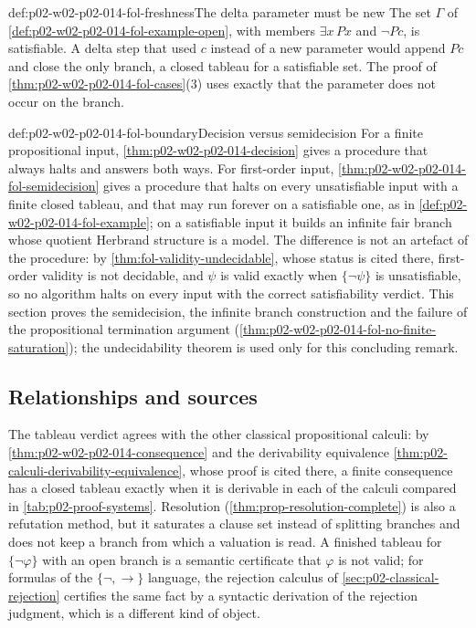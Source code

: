 \begin{hbwarning}{def:p02-w02-p02-014-fol-freshness}{The delta parameter must be new}
The set \(\Gamma\) of
\cref{def:p02-w02-p02-014-fol-example-open}, with members \(\exists x\,Px\)
and \(\neg Pc\), is satisfiable.  A delta
step that used \(c\) instead of a new parameter would append \(Pc\) and close
the only branch, a closed tableau for a satisfiable set.  The proof of
\cref{thm:p02-w02-p02-014-fol-cases}(3) uses exactly that the parameter
does not occur on the branch.
\end{hbwarning}

\begin{proofboundary}{def:p02-w02-p02-014-fol-boundary}{Decision versus semidecision}
For a finite propositional input, \cref{thm:p02-w02-p02-014-decision}
gives a procedure that always halts and answers both ways.  For first-order
input, \cref{thm:p02-w02-p02-014-fol-semidecision} gives a procedure that
halts on every unsatisfiable input with a finite closed tableau, and that may
run forever on a satisfiable one, as in
\cref{def:p02-w02-p02-014-fol-example}; on a satisfiable input it builds an
infinite fair branch whose quotient Herbrand structure is a model.  The
difference is not an artefact of the procedure: by
\cref{thm:fol-validity-undecidable}, whose status is cited there, first-order
validity is not decidable, and \(\psi\) is valid exactly when \(\{\neg\psi\}\)
is unsatisfiable, so no algorithm halts on every input with the correct
satisfiability verdict.  This section proves the semidecision, the infinite
branch construction and the failure of the propositional termination
argument (\cref{thm:p02-w02-p02-014-fol-no-finite-saturation}); the
undecidability theorem is used only for this concluding remark.
\end{proofboundary}

\subsection{Relationships and sources}
\label{sec:p02-w02-p02-014-relations}

The tableau verdict agrees with the other classical propositional calculi:
by \cref{thm:p02-w02-p02-014-consequence} and the derivability equivalence
\cref{thm:p02-calculi-derivability-equivalence}, whose proof is cited there,
a finite consequence has a
closed tableau exactly when it is derivable in each of the calculi compared
in \cref{tab:p02-proof-systems}.  Resolution
(\cref{thm:prop-resolution-complete}) is also a refutation method, but it
saturates a clause set instead of splitting branches and does not keep a
branch from which a valuation is read.  A finished tableau for
\(\{\neg\varphi\}\) with an open branch is a semantic certificate that
\(\varphi\) is not valid; for formulas of the \(\{\neg,\to\}\) language, the rejection calculus of
\cref{sec:p02-classical-rejection} certifies the same fact by a syntactic
derivation of the rejection judgment, which is a different kind of object.

